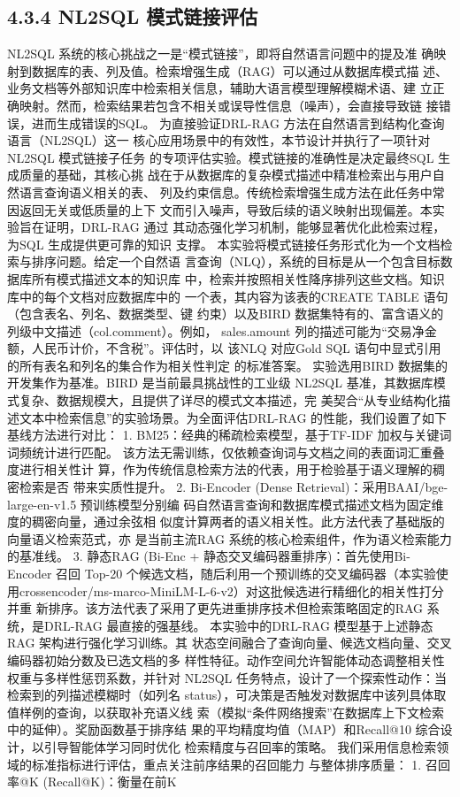 \documentclass[12pt,a4paper,openright,UTF8]{ctexbook}
\begin{document}
\subsection{4.3.4 NL2SQL 模式链接评估}

NL2SQL 系统的核心挑战之一是“模式链接”，即将自然语言问题中的提及准 确映射到数据库的表、列及值。检索增强生成（RAG）可以通过从数据库模式描 述、业务文档等外部知识库中检索相关信息，辅助大语言模型理解模糊术语、建 立正确映射。然而，检索结果若包含不相关或误导性信息（噪声），会直接导致链 接错误，进而生成错误的SQL。 为直接验证DRL-RAG 方法在自然语言到结构化查询语言（NL2SQL）这一 核心应用场景中的有效性，本节设计并执行了一项针对NL2SQL 模式链接子任务 的专项评估实验。模式链接的准确性是决定最终SQL 生成质量的基础，其核心挑 战在于从数据库的复杂模式描述中精准检索出与用户自然语言查询语义相关的表、 列及约束信息。传统检索增强生成方法在此任务中常因返回无关或低质量的上下 文而引入噪声，导致后续的语义映射出现偏差。本实验旨在证明，DRL-RAG 通过 其动态强化学习机制，能够显著优化此检索过程，为SQL 生成提供更可靠的知识 支撑。 本实验将模式链接任务形式化为一个文档检索与排序问题。给定一个自然语 言查询（NLQ），系统的目标是从一个包含目标数据库所有模式描述文本的知识库 中，检索并按照相关性降序排列这些文档。知识库中的每个文档对应数据库中的 一个表，其内容为该表的CREATE TABLE 语句（包含表名、列名、数据类型、键 约束）以及BIRD 数据集特有的、富含语义的列级中文描述（col.comment）。例如， sales.amount 列的描述可能为“交易净金额，人民币计价，不含税”。评估时，以 该NLQ 对应Gold SQL 语句中显式引用的所有表名和列名的集合作为相关性判定 的标准答案。 实验选用BIRD 数据集的开发集作为基准。BIRD 是当前最具挑战性的工业级 NL2SQL 基准，其数据库模式复杂、数据规模大，且提供了详尽的模式文本描述，完 美契合“从专业结构化描述文本中检索信息”的实验场景。为全面评估DRL-RAG 的性能，我们设置了如下基线方法进行对比： 1. BM25：经典的稀疏检索模型，基于TF-IDF 加权与关键词词频统计进行匹配。 该方法无需训练，仅依赖查询词与文档之间的表面词汇重叠度进行相关性计 算，作为传统信息检索方法的代表，用于检验基于语义理解的稠密检索是否 带来实质性提升。 2. Bi-Encoder (Dense Retrieval)：采用BAAI/bge-large-en-v1.5 预训练模型分别编 码自然语言查询和数据库模式描述文档为固定维度的稠密向量，通过余弦相 似度计算两者的语义相关性。此方法代表了基础版的向量语义检索范式，亦 是当前主流RAG 系统的核心检索组件，作为语义检索能力的基准线。 3. 静态RAG (Bi-Enc + 静态交叉编码器重排序)：首先使用Bi-Encoder 召回 Top-20 个候选文档，随后利用一个预训练的交叉编码器（本实验使用crossencoder/ms-marco-MiniLM-L-6-v2）对这批候选进行精细化的相关性打分并重 新排序。该方法代表了采用了更先进重排序技术但检索策略固定的RAG 系 统，是DRL-RAG 最直接的强基线。 本实验中的DRL-RAG 模型基于上述静态RAG 架构进行强化学习训练。其 状态空间融合了查询向量、候选文档向量、交叉编码器初始分数及已选文档的多 样性特征。动作空间允许智能体动态调整相关性权重与多样性惩罚系数，并针对 NL2SQL 任务特点，设计了一个探索性动作：当检索到的列描述模糊时（如列名 status），可决策是否触发对数据库中该列具体取值样例的查询，以获取补充语义线 索（模拟“条件网络搜索”在数据库上下文检索中的延伸）。奖励函数基于排序结 果的平均精度均值（MAP）和Recall@10 综合设计，以引导智能体学习同时优化 检索精度与召回率的策略。 我们采用信息检索领域的标准指标进行评估，重点关注前序结果的召回能力 与整体排序质量： 1. 召回率@K (Recall@K)：衡量在前K 
\end{document}
